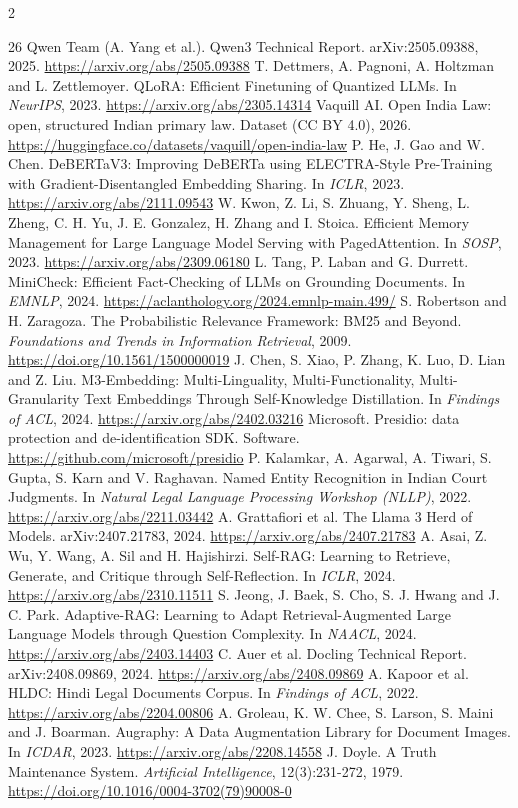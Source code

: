 \documentclass[10pt,a4paper]{article}
\begin{document}
\begin{multicols}{2}
\begin{thebibliography}{26}
 Qwen Team (A. Yang et al.). Qwen3 Technical Report. arXiv:2505.09388, 2025. \url{https://arxiv.org/abs/2505.09388}
 T. Dettmers, A. Pagnoni, A. Holtzman and L. Zettlemoyer. QLoRA: Efficient Finetuning of Quantized LLMs. In \emph{NeurIPS}, 2023. \url{https://arxiv.org/abs/2305.14314}
 Vaquill AI. Open India Law: open, structured Indian primary law. Dataset (CC BY 4.0), 2026. \url{https://huggingface.co/datasets/vaquill/open-india-law}
 P. He, J. Gao and W. Chen. DeBERTaV3: Improving DeBERTa using ELECTRA-Style Pre-Training with Gradient-Disentangled Embedding Sharing. In \emph{ICLR}, 2023. \url{https://arxiv.org/abs/2111.09543}
 W. Kwon, Z. Li, S. Zhuang, Y. Sheng, L. Zheng, C. H. Yu, J. E. Gonzalez, H. Zhang and I. Stoica. Efficient Memory Management for Large Language Model Serving with PagedAttention. In \emph{SOSP}, 2023. \url{https://arxiv.org/abs/2309.06180}
 L. Tang, P. Laban and G. Durrett. MiniCheck: Efficient Fact-Checking of LLMs on Grounding Documents. In \emph{EMNLP}, 2024. \url{https://aclanthology.org/2024.emnlp-main.499/}
 S. Robertson and H. Zaragoza. The Probabilistic Relevance Framework: BM25 and Beyond. \emph{Foundations and Trends in Information Retrieval}, 2009. \url{https://doi.org/10.1561/1500000019}
 J. Chen, S. Xiao, P. Zhang, K. Luo, D. Lian and Z. Liu. M3-Embedding: Multi-Linguality, Multi-Functionality, Multi-Granularity Text Embeddings Through Self-Knowledge Distillation. In \emph{Findings of ACL}, 2024. \url{https://arxiv.org/abs/2402.03216}
 Microsoft. Presidio: data protection and de-identification SDK. Software. \url{https://github.com/microsoft/presidio}
 P. Kalamkar, A. Agarwal, A. Tiwari, S. Gupta, S. Karn and V. Raghavan. Named Entity Recognition in Indian Court Judgments. In \emph{Natural Legal Language Processing Workshop (NLLP)}, 2022. \url{https://arxiv.org/abs/2211.03442}
 A. Grattafiori et al. The Llama 3 Herd of Models. arXiv:2407.21783, 2024. \url{https://arxiv.org/abs/2407.21783}
 A. Asai, Z. Wu, Y. Wang, A. Sil and H. Hajishirzi. Self-RAG: Learning to Retrieve, Generate, and Critique through Self-Reflection. In \emph{ICLR}, 2024. \url{https://arxiv.org/abs/2310.11511}
 S. Jeong, J. Baek, S. Cho, S. J. Hwang and J. C. Park. Adaptive-RAG: Learning to Adapt Retrieval-Augmented Large Language Models through Question Complexity. In \emph{NAACL}, 2024. \url{https://arxiv.org/abs/2403.14403}
 C. Auer et al. Docling Technical Report. arXiv:2408.09869, 2024. \url{https://arxiv.org/abs/2408.09869}
 A. Kapoor et al. HLDC: Hindi Legal Documents Corpus. In \emph{Findings of ACL}, 2022. \url{https://arxiv.org/abs/2204.00806}
 A. Groleau, K. W. Chee, S. Larson, S. Maini and J. Boarman. Augraphy: A Data Augmentation Library for Document Images. In \emph{ICDAR}, 2023. \url{https://arxiv.org/abs/2208.14558}
 J. Doyle. A Truth Maintenance System. \emph{Artificial Intelligence}, 12(3):231-272, 1979. \url{https://doi.org/10.1016/0004-3702(79)90008-0}
\end{thebibliography}
\end{multicols}
\endgroup
\end{document}
